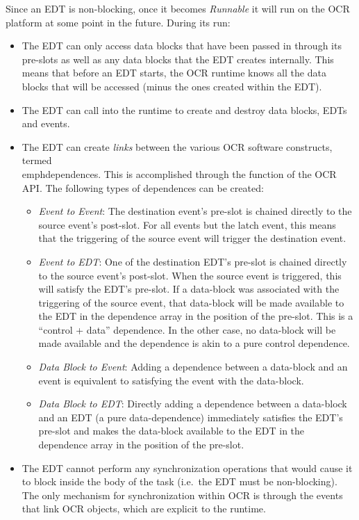 Since an EDT is non-blocking, once it
becomes \emph{Runnable} it will run on the OCR platform at some point in the
future. During its run:
\begin{itemize}
\item The EDT can only access data blocks that have been passed in
through its pre-slots as well as any data blocks that the EDT creates
internally. This means that before an EDT starts, the OCR runtime
knows all the data blocks that will be accessed (minus the ones
created within the EDT).

\item The EDT can call into the runtime to create and destroy data
blocks, EDTs and events.

\item The EDT can create \emph{links} between the various OCR
software constructs, termed \\emph{dependences}. This is
accomplished through the  function of the OCR
API. The following types of dependences can be created:
\begin{itemize}
\item \emph{Event to Event}: The destination event’s pre-slot is chained
directly to the source event’s post-slot.
For all events but the latch event, this means that the triggering of
the source event will trigger the destination event.

\item \emph{Event to EDT}: One of the destination EDT’s pre-slot is chained
directly to the source event’s post-slot. When the source event is
triggered, this will satisfy the EDT’s pre-slot. If a data-block was
associated with the triggering of the source event, that data-block
will be made available to the EDT in the dependence array in the
position of the pre-slot. This is a “control + data” dependence. In
the other case, no data-block will be made available and the
dependence is akin to a pure control dependence.

\item \emph{Data Block to Event}: Adding a dependence between a data-block and an
event is equivalent to satisfying the event with the data-block.

\item \emph{Data Block to EDT}: Directly adding a dependence between a data-block and
an EDT (a pure data-dependence) immediately satisfies the EDT’s
pre-slot and makes the data-block available to the EDT in the
dependence array in the position of the pre-slot.
\end{itemize}

\item The EDT cannot perform any synchronization operations that would
cause it to block inside the body of the task (i.e.\ the EDT must be
non-blocking). The only mechanism for synchronization within OCR is
through the events that link OCR objects, which are explicit to the
runtime.
\end{itemize}


